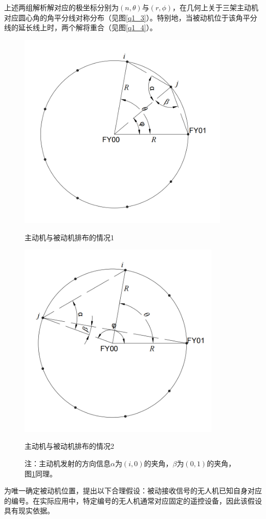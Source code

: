 \documentclass[withoutpreface,bwprint]{cumcmthesis} %
\begin{document}
上述两组解析解对应的极坐标分别为\((n,\theta)\)与\((r,\phi)\)，在几何上关于三架主动机对应圆心角的角平分线对称分布（见图\ref{q1_3}）。特别地，当被动机位于该角平分线的延长线上时，两个解将重合（见图\ref{q1_4}）。

\begin{figure}[H]
    \centering
    \begin{minipage}{0.49\textwidth}
        \centering
        \includegraphics[width=0.9\textwidth]{../../figure/q1_1.png} 
        \caption{主动机与被动机排布的情况1}
        \label{q1_1}
    \end{minipage}
    \begin{minipage}{0.49\textwidth}
        \centering
        \includegraphics[width=0.86\textwidth]{../../figure/q1_2.png} 
        \caption{主动机与被动机排布的情况2}
        \label{q1_2}   
    \end{minipage}
    \caption*{\small 注：主动机发射的方向信息$\alpha$为$(i,0)$的夹角，$\beta$为$(0,1)$的夹角，图\ref{q1_2}同理。}
\end{figure}
为唯一确定被动机位置，提出以下合理假设：被动接收信号的无人机已知自身对应的编号。在实际应用中，特定编号的无人机通常对应固定的遥控设备，因此该假设具有现实依据。
\end{document}
